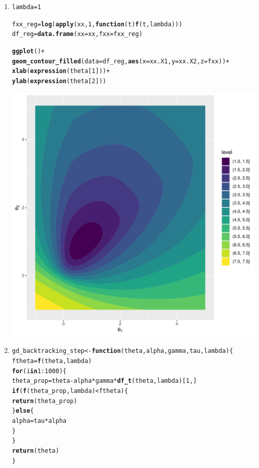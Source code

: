\documentclass[a4paper]{article}
\makeatletter
\newcommand{\hlnum}[1]{\textcolor[rgb]{0.686,0.059,0.569}{#1}}%
\newcommand{\hlopt}[1]{\textcolor[rgb]{0,0,0}{#1}}%
\newcommand{\hlstd}[1]{\textcolor[rgb]{0.345,0.345,0.345}{#1}}%
\newcommand{\hlkwa}[1]{\textcolor[rgb]{0.161,0.373,0.58}{\textbf{#1}}}%
\newcommand{\hlkwb}[1]{\textcolor[rgb]{0.69,0.353,0.396}{#1}}%
\newcommand{\hlkwc}[1]{\textcolor[rgb]{0.333,0.667,0.333}{#1}}%
\newcommand{\hlkwd}[1]{\textcolor[rgb]{0.737,0.353,0.396}{\textbf{#1}}}%
\newenvironment{kframe}{%
 \def\at@end@of@kframe{}%
 \ifinner\ifhmode%
  \def\at@end@of@kframe{\end{minipage}}%
  \begin{minipage}{\columnwidth}%
 \fi\fi%
 \def\FrameCommand##1{\hskip\@totalleftmargin \hskip-\fboxsep
 \colorbox{shadecolor}{##1}\hskip-\fboxsep
     \hskip-\linewidth \hskip-\@totalleftmargin \hskip\columnwidth}%
 \MakeFramed {\advance\hsize-\width
   \@totalleftmargin\z@ \linewidth\hsize
   \@setminipage}}%
 {\par\unskip\endMakeFramed%
 \at@end@of@kframe}
\newenvironment{knitrout}{}{} %
\makeatother
\begin{document}
{\begin{enumerate}
\item 
\begin{knitrout}
\color{fgcolor}\begin{kframe}
\begin{alltt}
\hlstd{lambda} \hlkwb{=} \hlnum{1}

\hlstd{fxx_reg} \hlkwb{=} \hlkwd{log}\hlstd{(}\hlkwd{apply}\hlstd{(xx,} \hlnum{1}\hlstd{,} \hlkwa{function}\hlstd{(}\hlkwc{t}\hlstd{)} \hlkwd{f}\hlstd{(t, lambda)))}
\hlstd{df_reg} \hlkwb{=} \hlkwd{data.frame}\hlstd{(}\hlkwc{xx} \hlstd{= xx,} \hlkwc{fxx} \hlstd{= fxx_reg)}

\hlkwd{ggplot}\hlstd{()} \hlopt{+}
    \hlkwd{geom_contour_filled}\hlstd{(}\hlkwc{data} \hlstd{= df_reg,} \hlkwd{aes}\hlstd{(}\hlkwc{x} \hlstd{= xx.X1,} \hlkwc{y} \hlstd{= xx.X2,} \hlkwc{z} \hlstd{= fxx))} \hlopt{+}
    \hlkwd{xlab}\hlstd{(}\hlkwd{expression}\hlstd{(theta[}\hlnum{1}\hlstd{]))} \hlopt{+}
    \hlkwd{ylab}\hlstd{(}\hlkwd{expression}\hlstd{(theta[}\hlnum{2}\hlstd{]))}
\end{alltt}
\end{kframe}
\includegraphics[width=0.5\linewidth]{figure/mv-plot_r_emp_reg-1} 
\end{knitrout}
\item
\begin{knitrout}
\color{fgcolor}\begin{kframe}
\begin{alltt}
\hlstd{gd_backtracking_step} \hlkwb{<-} \hlkwa{function}\hlstd{(}\hlkwc{theta}\hlstd{,} \hlkwc{alpha}\hlstd{,} \hlkwc{gamma}\hlstd{,} \hlkwc{tau}\hlstd{,} \hlkwc{lambda}\hlstd{)\{}
    \hlstd{ftheta} \hlkwb{=} \hlkwd{f}\hlstd{(theta, lambda)}
    \hlkwa{for}\hlstd{(i} \hlkwa{in} \hlnum{1}\hlopt{:}\hlnum{1000}\hlstd{)\{}
      \hlstd{theta_prop} \hlkwb{=} \hlstd{theta} \hlopt{-} \hlstd{alpha} \hlopt{*} \hlstd{gamma} \hlopt{*} \hlkwd{df_t}\hlstd{(theta, lambda)[}\hlnum{1}\hlstd{,]}
      \hlkwa{if}\hlstd{(}\hlkwd{f}\hlstd{(theta_prop, lambda)} \hlopt{<} \hlstd{ftheta)\{}
        \hlkwd{return}\hlstd{(theta_prop)}
      \hlstd{\}}\hlkwa{else}\hlstd{\{}
        \hlstd{alpha} \hlkwb{=} \hlstd{tau} \hlopt{*} \hlstd{alpha}
      \hlstd{\}}
    \hlstd{\}}
    \hlkwd{return}\hlstd{(theta)}
\hlstd{\}}


\end{alltt}
\end{kframe}
\end{knitrout}
\end{enumerate}}
\end{document}
